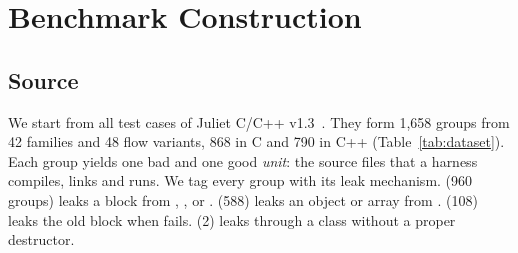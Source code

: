 \section{Benchmark Construction}
\label{sec:benchmark}

\subsection{Source}
We start from all \cwe{} test cases of Juliet C/C++ v1.3~\cite{black2018juliet13,sardjuliet13}.
They form 1,658 groups from 42 families and 48 flow variants, 868 in C and 790 in C++ (Table~\ref{tab:dataset}). %
Each group yields one bad and one good \emph{unit}: the source files that a harness compiles, links and runs.
We tag every group with its leak mechanism.
 (960 groups) leaks a block from , ,  or .
 (588) leaks an object or array from .
 (108) leaks the old block when  fails.
 (2) leaks through a class without a proper destructor.

